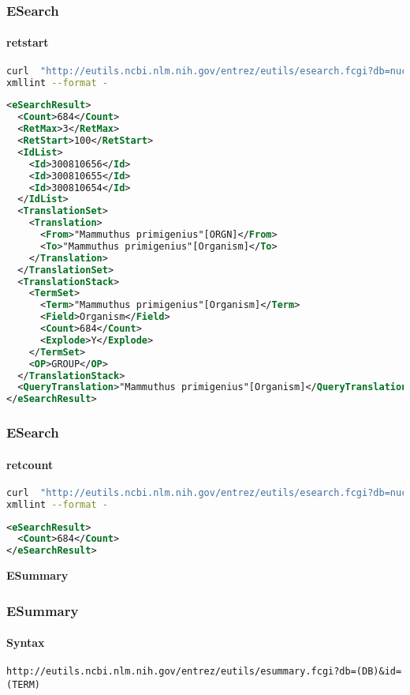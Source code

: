 \documentclass{beamer}
\newcommand{\centeredtitle}[1]{
\begin{center}
    \Huge{\bf{#1}}
\end{center}
}
\newcommand{\hugeslide}[1]{
\begin{frame}
\centeredtitle{#1}
\end{frame}
}
\begin{document}
\begin{frame}[fragile]
\frametitle{ESearch}
\framesubtitle{retstart  }
\begin{lstlisting}[language=bash,basicstyle=\tiny,breaklines=true]
curl  "http://eutils.ncbi.nlm.nih.gov/entrez/eutils/esearch.fcgi?db=nucleotide&term=%22Mammuthus%20primigenius%22%5BORGN%5D&retmax=2&retstart=100" |\
xmllint --format -
\end{lstlisting}

\begin{lstlisting}[language=xml,basicstyle=\tiny,breaklines=false]
<eSearchResult>
  <Count>684</Count>
  <RetMax>3</RetMax>
  <RetStart>100</RetStart>
  <IdList>
    <Id>300810656</Id>
    <Id>300810655</Id>
    <Id>300810654</Id>
  </IdList>
  <TranslationSet>
    <Translation>
      <From>"Mammuthus primigenius"[ORGN]</From>
      <To>"Mammuthus primigenius"[Organism]</To>
    </Translation>
  </TranslationSet>
  <TranslationStack>
    <TermSet>
      <Term>"Mammuthus primigenius"[Organism]</Term>
      <Field>Organism</Field>
      <Count>684</Count>
      <Explode>Y</Explode>
    </TermSet>
    <OP>GROUP</OP>
  </TranslationStack>
  <QueryTranslation>"Mammuthus primigenius"[Organism]</QueryTranslation>
</eSearchResult>
\end{lstlisting}
\end{frame}

\begin{frame}[fragile]
\frametitle{ESearch}
\framesubtitle{retcount  }
\begin{lstlisting}[language=bash,basicstyle=\tiny,breaklines=true]
curl  "http://eutils.ncbi.nlm.nih.gov/entrez/eutils/esearch.fcgi?db=nucleotide&term=%22Mammuthus%20primigenius%22%5BORGN%5D&rettype=count" |\
xmllint --format -
\end{lstlisting}

\begin{lstlisting}[language=xml,breaklines=false]
<eSearchResult>
  <Count>684</Count>
</eSearchResult>
\end{lstlisting}
\end{frame}


\hugeslide{ESummary}


\begin{frame}[fragile]
\frametitle{ESummary}
\framesubtitle{Syntax}
\begin{lstlisting}
http://eutils.ncbi.nlm.nih.gov/entrez/eutils/esummary.fcgi?db=(DB)&id=(TERM)
\end{lstlisting}
\end{frame}
\end{document}
